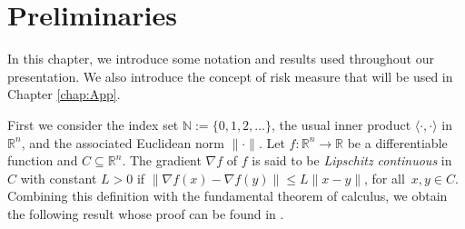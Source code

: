 \chapter{Preliminaries}  \label{chap:Prel}
\thispagestyle{empty}


In this chapter, we introduce  some notation and results used throughout our presentation. We also introduce the concept of risk measure that will be used in Chapter \ref{chap:App}.



First we  consider the  index set  ${\mathbb{N}}:=\{0,1,2,\ldots\}$,  the usual inner  product  $\langle \cdot,\cdot \rangle$ in $\mathbb{R}^n$, and the associated Euclidean norm    $\|\cdot\|$.
Let  $f:\mathbb{R}^n \to \mathbb{R}$ be a differentiable function and $C \subseteq \mathbb{R}^n$. The  gradient $\nabla f$ of $f$ is said to be {\it Lipschitz continuous} in $C$ with constant $L>0$ if $\|\nabla f(x)-\nabla f(y)\|\leq L \|x-y\|$, for all~$x, y\in C$. Combining this definition with the fundamental theorem of calculus, we obtain the following result whose proof can be found in \cite[Proposition A.24]{Bertsekas1999}.


